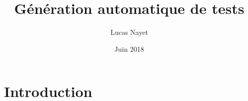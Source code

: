 \documentclass{article}
\title{Génération automatique de tests}
\author{Lucas Nayet}
\date{Juin 2018}
\begin{document}
\maketitle

\section{Introduction}
\end{document}
